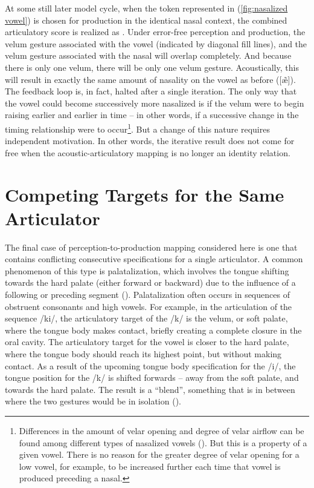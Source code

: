 At some still later model cycle, when the token represented in (\ref{fig:nasalized vowel})
is chosen for production in the identical nasal context, the combined
articulatory score is realized as .
Under error-free perception and production, the velum gesture associated
with the vowel (indicated by diagonal fill lines), and the velum gesture
associated with the nasal will overlap completely. And because there
is only one velum, there will be only one velum gesture. Acoustically,
this will result in exactly the same amount of nasality on the vowel
as before ({[æ̃]}). The feedback loop is, in fact, halted
after a single iteration. The only way that the vowel could become
successively more nasalized is if the velum were to begin raising
earlier and earlier in time – in other words, if a successive change
in the timing relationship were to occur\footnote{Differences in the amount of velar opening and degree of velar airflow
can be found among different types of nasalized vowels (\citealt{bell1993understanding,hajek2000vowel}).
But this is a property of a given vowel. There is no reason for the
greater degree of velar opening for a low vowel, for example, to be
increased further each time that vowel is produced preceding a nasal.}. But a change of this nature requires independent motivation. In
other words, the iterative result does not come for free when the
acoustic-articulatory mapping is no longer an identity relation. 

\section{\label{sec:Competing-targets}Competing Targets for the Same Articulator}

The final case of perception-to-production mapping considered here
is one that contains conflicting consecutive specifications for a
single articulator. A common phenomenon of this type is palatalization,
which involves the tongue shifting towards the hard palate (either
forward or backward) due to the influence of a following or preceding
segment (\citealt{Guion1998,Keating1993}). Palatalization often occurs
in sequences of obstruent consonants and high vowels. For example,
in the articulation of the sequence {/ki/}, the articulatory
target of the {/k/} is the velum, or soft palate, where the
tongue body makes contact, briefly creating a complete closure in
the oral cavity. The articulatory target for the vowel is closer to
the hard palate, where the tongue body should reach its highest point,
but without making contact. As a result of the upcoming tongue body
specification for the {/i/}, the tongue position for the
{/k/} is shifted forwards – away from the soft palate, and
towards the hard palate. The result is a “blend”, something
that is in between where the two gestures would be in isolation (\citealt{Browman1986,Zsiga2000}). 

